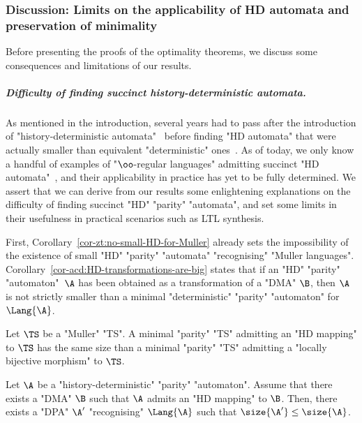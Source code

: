 \documentclass{theoretics}
\begin{document}
\subsubsection{Discussion: Limits on the applicability of HD automata and preservation of minimality}

Before presenting the proofs of the optimality theorems, we discuss some consequences and limitations of our results.


\subparagraph*{Difficulty of finding succinct history-deterministic automata.}
As mentioned in the introduction, several years had to pass after the introduction of "history-deterministic automata"~\cite{HP06}  before finding "HD automata" that were actually smaller than equivalent "deterministic" ones~\cite{KS15DeterminisationGFG}.
As of today, we only know a handful of examples of "$\oo$-regular languages" admitting succinct "HD automata"~\cite{AK22MinimizingGFG, KS15DeterminisationGFG,CCL22SizeGFG}, and their applicability in practice has yet to be fully determined. We assert that we can derive from our results some enlightening explanations on the difficulty of finding succinct "HD" "parity" "automata", and set some limits in their usefulness in practical scenarios such as LTL synthesis.

First, Corollary~\ref{cor-zt:no-small-HD-for-Muller} already sets the impossibility of the existence of small "HD" "parity" "automata" "recognising" "Muller languages". Corollary~\ref{cor-acd:HD-transformations-are-big} states that if an "HD" "parity" "automaton"~$\A$ has been obtained as a transformation of a "DMA" $\B$, then $\A$ is not strictly smaller than a minimal "deterministic" "parity" "automaton" for~$\Lang{\A}$.

\begin{corollary}
	Let $\TS$ be a  "Muller" "TS". A minimal "parity" "TS" admitting an "HD mapping" to $\TS$ has the same size than a minimal "parity" "TS" admitting a "locally bijective morphism" to $\TS$.
\end{corollary}



\begin{corollary}\label{cor-acd:HD-transformations-are-big}
	Let $\A$ be a "history-deterministic" "parity" "automaton". Assume that there exists a "DMA" $\B$ such that $\A$ admits an "HD mapping" to $\B$. Then, there exists a "DPA" $\A'$ "recognising" $\Lang{\A}$ such that $\size{\A'}\leq \size{\A}$.
\end{corollary}
\end{document}
